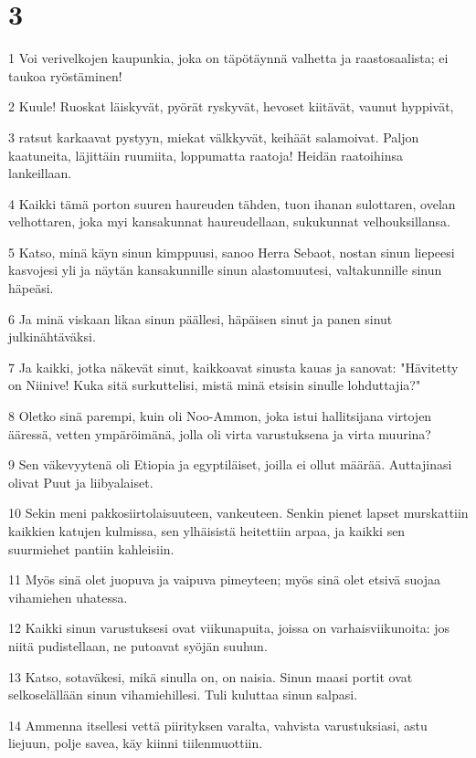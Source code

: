 \chapter{3}

\par 1 Voi verivelkojen kaupunkia, joka on täpötäynnä valhetta ja raastosaalista; ei taukoa ryöstäminen!
\par 2 Kuule! Ruoskat läiskyvät, pyörät ryskyvät, hevoset kiitävät, vaunut hyppivät,
\par 3 ratsut karkaavat pystyyn, miekat välkkyvät, keihäät salamoivat. Paljon kaatuneita, läjittäin ruumiita, loppumatta raatoja! Heidän raatoihinsa lankeillaan.
\par 4 Kaikki tämä porton suuren haureuden tähden, tuon ihanan sulottaren, ovelan velhottaren, joka myi kansakunnat haureudellaan, sukukunnat velhouksillansa.
\par 5 Katso, minä käyn sinun kimppuusi, sanoo Herra Sebaot, nostan sinun liepeesi kasvojesi yli ja näytän kansakunnille sinun alastomuutesi, valtakunnille sinun häpeäsi.
\par 6 Ja minä viskaan likaa sinun päällesi, häpäisen sinut ja panen sinut julkinähtäväksi.
\par 7 Ja kaikki, jotka näkevät sinut, kaikkoavat sinusta kauas ja sanovat: "Hävitetty on Niinive! Kuka sitä surkuttelisi, mistä minä etsisin sinulle lohduttajia?"
\par 8 Oletko sinä parempi, kuin oli Noo-Ammon, joka istui hallitsijana virtojen ääressä, vetten ympäröimänä, jolla oli virta varustuksena ja virta muurina?
\par 9 Sen väkevyytenä oli Etiopia ja egyptiläiset, joilla ei ollut määrää. Auttajinasi olivat Puut ja liibyalaiset.
\par 10 Sekin meni pakkosiirtolaisuuteen, vankeuteen. Senkin pienet lapset murskattiin kaikkien katujen kulmissa, sen ylhäisistä heitettiin arpaa, ja kaikki sen suurmiehet pantiin kahleisiin.
\par 11 Myös sinä olet juopuva ja vaipuva pimeyteen; myös sinä olet etsivä suojaa vihamiehen uhatessa.
\par 12 Kaikki sinun varustuksesi ovat viikunapuita, joissa on varhaisviikunoita: jos niitä pudistellaan, ne putoavat syöjän suuhun.
\par 13 Katso, sotaväkesi, mikä sinulla on, on naisia. Sinun maasi portit ovat selkoselällään sinun vihamiehillesi. Tuli kuluttaa sinun salpasi.
\par 14 Ammenna itsellesi vettä piirityksen varalta, vahvista varustuksiasi, astu liejuun, polje savea, käy kiinni tiilenmuottiin.
